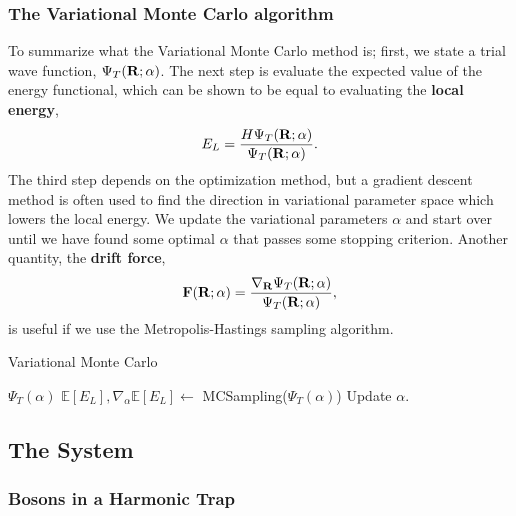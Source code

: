 \subsubsection{The Variational Monte Carlo algorithm}
To summarize what the Variational Monte Carlo method is; first, we state a trial wave function, $\Psi_T(\vb{R}; \alpha)$. The next step is evaluate the expected value of the energy functional, which can be shown to be equal to evaluating the \textbf{local energy},
\begin{equation}\label{eq:local_energy}
    E_L = \frac{H\Psi_T(\vb{R};\alpha)}{\Psi_T(\vb{R};\alpha)}.
\end{equation}
The third step depends on the optimization method, but a gradient descent method is often used to find the direction in variational parameter space which lowers the local energy. We update the variational parameters $\alpha$ and start over until we have found some optimal $\alpha$ that passes some stopping criterion. 
Another quantity, the \textbf{drift force}, 
\begin{equation}\label{eq:drift_force}
    \vb{F(\vb{R};\alpha)} = \frac{\nabla_{\vb{R}}\Psi_T(\vb{R};\alpha)}{\Psi_T(\vb{R};\alpha)},
\end{equation}
is useful if we use the Metropolis-Hastings sampling algorithm. 


\begin{algorithm}
\caption{Variational Monte Carlo}\label{algo:variational_monte_carlo}
\begin{algorithmic}[1]
\State $\Psi_T(\alpha)$
\State $\mathbb{E}[E_L], \nabla_{\alpha}\mathbb{E}[E_L]\gets$ MCSampling($\Psi_T(\alpha)$)
\State Update $\alpha$. 

\end{algorithmic}
\end{algorithm}

\subsection{The System}

\subsubsection{Bosons in a Harmonic Trap}

